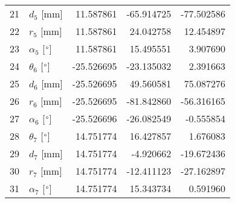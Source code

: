 \documentclass{standalone}%
\begin{document}
\begin{tabular}{llrrr}
21 &              $d_{5}$ [mm] &  11.587861 &  -65.914725 &  -77.502586 \\
22 &              $r_{5}$ [mm] &  11.587861 &   24.042758 &   12.454897 \\
23 &  $\alpha_{5}$ [$\degree$] &  11.587861 &   15.495551 &    3.907690 \\
24 &  $\theta_{6}$ [$\degree$] & -25.526695 &  -23.135032 &    2.391663 \\
25 &              $d_{6}$ [mm] & -25.526695 &   49.560581 &   75.087276 \\
26 &              $r_{6}$ [mm] & -25.526695 &  -81.842860 &  -56.316165 \\
27 &  $\alpha_{6}$ [$\degree$] & -25.526696 &  -26.082549 &   -0.555854 \\
28 &  $\theta_{7}$ [$\degree$] &  14.751774 &   16.427857 &    1.676083 \\
29 &              $d_{7}$ [mm] &  14.751774 &   -4.920662 &  -19.672436 \\
30 &              $r_{7}$ [mm] &  14.751774 &  -12.411123 &  -27.162897 \\
31 &  $\alpha_{7}$ [$\degree$] &  14.751774 &   15.343734 &    0.591960 \\
\bottomrule
\end{tabular}
%
\end{document}
